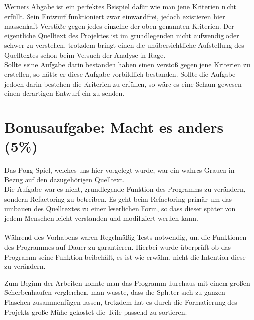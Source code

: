 \documentclass{pi1}
\begin{document}
Werners Abgabe ist ein perfektes Beispiel dafür wie man jene Kriterien nicht erfüllt.
Sein Entwurf funktioniert zwar einwandfrei, jedoch existieren hier massenhaft Verstöße gegen jedes einzelne der oben genannten Kriterien.\newline
Der eigentliche Quelltext des Projektes ist im grundlegenden nicht aufwendig oder schwer zu verstehen, trotzdem bringt einen die unübersichtliche Aufstellung des Quelltextes schon beim Versuch der Analyse in Rage.\\
Sollte seine Aufgabe darin bestanden haben einen verstoß gegen jene Kriterien zu erstellen, so hätte er diese Aufgabe vorbildlich bestanden.
Sollte die Aufgabe jedoch darin bestehen die Kriterien zu erfüllen, so wäre es eine Scham gewesen einen derartigen Entwurf ein zu senden.

\section{Bonusaufgabe: Macht es anders (5\%)}

Das Pong-Spiel, welches uns hier vorgelegt wurde, war ein wahres Grauen in Bezug auf den dazugehörigen Quelltext.\\
Die Aufgabe war es nicht, grundlegende Funktion des Programms zu verändern, sondern Refactoring zu betreiben.
Es geht beim Refactoring primär um das umbauen des Quelltextes zu einer leserlichen Form, so dass dieser später von jedem Menschen leicht verstanden und modifiziert werden kann.\\
\\
Während des Vorhabens waren Regelmäßig Tests notwendig, um die Funktionen des Programmes auf Dauer zu garantieren. Hierbei wurde überprüft ob das Programm seine Funktion beibehält, es ist wie erwähnt nicht die Intention diese zu verändern.\newline

Zum Beginn der Arbeiten konnte man das Programm durchaus mit einem großen Scherbenhaufen vergleichen, man wusste, dass die Splitter sich zu ganzen Flaschen zusammenfügen lassen, trotzdem hat es durch die Formatierung des Projekts große Mühe gekostet die Teile passend zu sortieren.\newline
\end{document}
